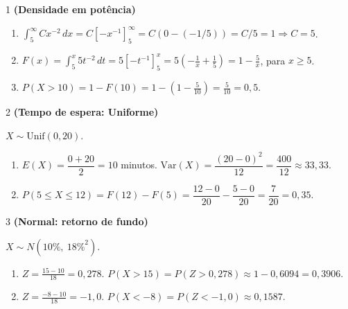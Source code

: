 \documentclass[11pt]{article}
\begin{document}

\begin{questao}{1} \textbf{(Densidade em potência)}
\begin{solucao}
\begin{enumerate}[label=(\alph*)]
  \item $\int_5^\infty Cx^{-2}\,dx = C\left[-x^{-1}\right]_5^\infty = C\left(0-(-1/5)\right) =
    C/5 = 1 \Rightarrow C=5$.
  \item $F(x) = \int_5^x 5t^{-2}\,dt = 5\left[-t^{-1}\right]_5^x = 5\left(-\frac1x+\frac15\right)
    = 1-\frac5x$, para $x\ge5$.
  \item $P(X>10) = 1-F(10) = 1-\left(1-\frac{5}{10}\right) = \frac{5}{10}=0{,}5$.
\end{enumerate}
\end{solucao}
\end{questao}

\begin{questao}{2} \textbf{(Tempo de espera: Uniforme)}
\begin{solucao}
$X\sim\text{Unif}(0,20)$.
\begin{enumerate}[label=(\alph*)]
  \item $E(X) = \dfrac{0+20}{2}=10$ minutos. $\mathrm{Var}(X) = \dfrac{(20-0)^2}{12} =
    \dfrac{400}{12}\approx 33{,}33$.
  \item $P(5\le X\le 12) = F(12)-F(5) = \dfrac{12-0}{20}-\dfrac{5-0}{20} = \dfrac{7}{20}=0{,}35$.
\end{enumerate}
\end{solucao}
\end{questao}

\begin{questao}{3} \textbf{(Normal: retorno de fundo)}
\begin{solucao}
$X\sim N(10\%,\ 18\%^2)$.
\begin{enumerate}[label=(\alph*)]
  \item $Z=\frac{15-10}{18}=0{,}278$. $P(X>15)=P(Z>0{,}278)\approx1-0{,}6094=0{,}3906$.
  \item $Z=\frac{-8-10}{18}=-1{,}0$. $P(X<-8)=P(Z<-1{,}0)\approx0{,}1587$.
\end{enumerate}
\end{solucao}
\end{questao}
\end{document}
